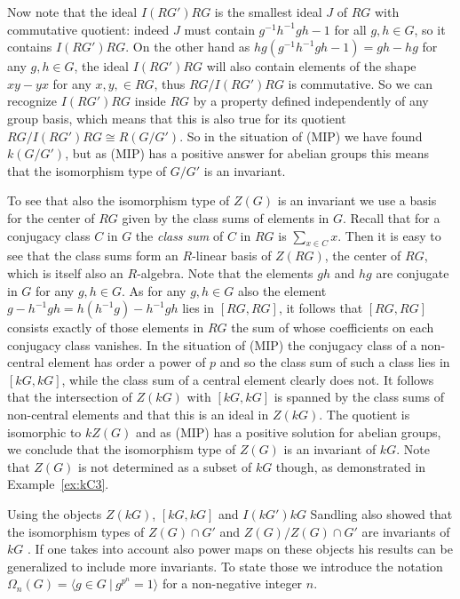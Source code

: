 \documentclass[11pt, a4paper]{amsart}
\theoremstyle{definition}
\begin{document}
Now note that the ideal $I(RG')RG$ is the smallest ideal $J$ of $RG$ with commutative quotient: indeed $J$ must contain $g^{-1}h^{-1}gh-1$ for all $g,h \in G$, so it contains $I(RG')RG$. On the other hand as $hg(g^{-1}h^{-1}gh-1) = gh-hg$ for any $g,h \in G$, the ideal $I(RG')RG$ will also contain elements of the shape $xy - yx$ for any $x,y, \in RG$, thus $RG/I(RG')RG$ is commutative. So we can recognize $I(RG')RG$ inside $RG$ by a property defined independently of any group basis, which means that this is also true for its quotient $RG/I(RG')RG \cong R(G/G')$. So in the situation of (MIP) we have found $k(G/G')$, but as (MIP) has a positive answer for abelian groups this means that the isomorphism type of $G/G'$ is an invariant.

To see that also the isomorphism type of $Z(G)$ is an invariant we use a basis for the center of $RG$ given by the class sums of elements in $G$. Recall that for a conjugacy class $C$ in $G$ the \emph{class sum} of $C$ in $RG$ is $\sum_{x \in C} x$. Then it is easy to see that the class sums form an $R$-linear basis of $Z(RG)$, the center of $RG$, which is itself also an $R$-algebra. Note that the elements $gh$ and $hg$ are conjugate in $G$ for any 
$g,h \in G$. As for any $g,h \in G$ also the element $g-h^{-1}gh = h(h^{-1}g) - h^{-1}gh$ lies in $[RG,RG]$, it follows that $[RG,RG]$ consists exactly of those elements in $RG$ the sum of whose coefficients on each conjugacy class vanishes. In the situation of (MIP) the conjugacy class of a non-central element has order a power of $p$ and so the class sum of such a class lies in $[kG, kG]$, while the class sum of a central element clearly does not. It follows that the intersection of $Z(kG)$ with $[kG,kG]$ is spanned by the class sums of non-central elements and that this is an ideal in $Z(kG)$. The quotient is isomorphic to $kZ(G)$ and as (MIP) has a positive solution for abelian groups, we conclude that the isomorphism type of $Z(G)$ is an invariant of $kG$. Note that $Z(G)$ is not determined as a subset of $kG$ though, as demonstrated in Example~\ref{ex:kC3}.

Using the objects $Z(kG)$, $[kG, kG]$ and $I(kG')kG$ Sandling also showed that the isomorphism types of $Z(G) \cap G'$ and $Z(G)/Z(G)\cap G'$ are invariants of $kG$ \cite{SandlingSurvey}. If one takes into account also power maps on these objects his results can be generalized to include more invariants. To state those we introduce the notation $\Omega_n(G) = \langle g \in G \ | \ g^{p^n} = 1 \rangle$ for a non-negative integer $n$. 
\end{document}
